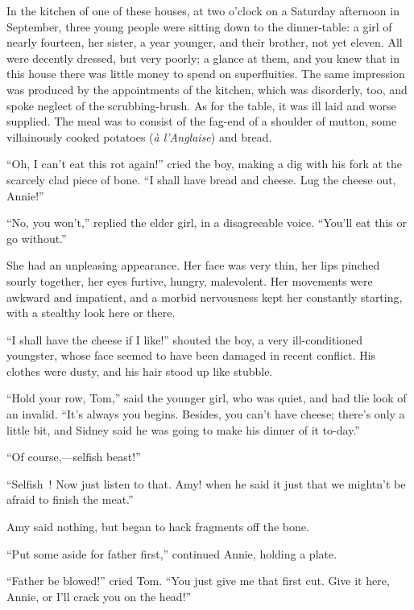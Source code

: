 In the kitchen of one of these houses, at two o'clock on a Saturday
afternoon in September, three young people were sitting down to the
dinner-table: a girl of nearly fourteen, her sister, a year younger, and
their brother, not yet eleven. All were decently dressed, but very
poorly; a glance at them, and you knew that in this house there was
little money to spend on superfluities. The same impression
{\protect\hypertarget{253}{}{}} was produced by the appointments of the
kitchen, which was disorderly, too, and spoke neglect of the
scrubbing-brush. As for the table, it was ill laid and worse supplied.
The meal was to consist of the fag-end of a shoulder of mutton, some
villainously cooked potatoes (\emph{à l'Anglaise}) and bread.

``Oh, I can't eat this rot again!'' cried the boy, making a dig with his
fork at the scarcely clad piece of bone. ``I shall have bread and
cheese. Lug the cheese out, Annie!''

``No, you won't,'' replied the elder girl, in a disagreeable voice.
``You'll eat this or go without.''

She had an unpleasing appearance. Her face was very thin, her lips
pinched sourly together, her eyes furtive, hungry, malevolent. Her
movements were awkward and impatient, and a morbid nervousness kept her
constantly starting, with a stealthy look here or there.

``I shall have the cheese if I like!'' shouted the boy, a very
ill-conditioned youngster, whose face seemed to have been damaged in
recent conflict. His clothes were dusty, and his hair stood up like
stubble.

``Hold your row, Tom,'' said the younger {\protect\hypertarget{254}{}{}}
girl, who was quiet, and had tlie look of an invalid. ``It's always you
begins. Besides, you can't have cheese; there's only a little bit, and
Sidney said he was going to make his dinner of it to-day.''

``Of course,---selfish beast!''

``Selfish~! Now just listen to that. Amy! when he said it just that we
mightn't be afraid to finish the meat.''

Amy said nothing, but began to hack fragments off the bone.

``Put some aside for father first,'' continued Annie, holding a plate.

``Father be blowed!'' cried Tom. ``You just give me that first cut. Give
it here, Annie, or I'll crack you on the head!''

